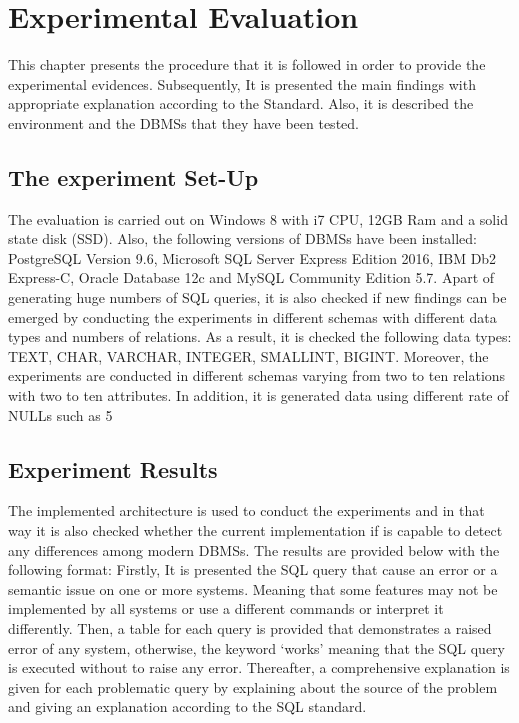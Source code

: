 \chapter{Experimental Evaluation}
This chapter presents the procedure that it is followed in order to provide the experimental evidences. Subsequently, It is presented the main findings with appropriate explanation according to the Standard. Also, it is described  the environment and the DBMSs that they have been tested. 

\section{The experiment Set-Up}
The evaluation is carried out on Windows 8 with i7 CPU, 12GB Ram and a solid state disk (SSD). Also, the  following versions of DBMSs have been installed: PostgreSQL Version 9.6, Microsoft SQL Server Express Edition 2016, IBM Db2 Express-C, Oracle Database 12c and  MySQL Community Edition 5.7. 
Apart of generating huge numbers of SQL queries, it is also checked if new findings can be emerged by conducting the experiments in different schemas with different data types and numbers of relations. As a result, it is checked the following data types:  TEXT, CHAR, VARCHAR, INTEGER, SMALLINT, BIGINT. Moreover, the experiments are conducted in different schemas varying from two to ten relations with two to ten attributes. In addition, it is generated data using different rate of NULLs such as 5%


\section{Experiment Results}
The implemented architecture is used to conduct the experiments and in that way it is also checked whether the current implementation if is capable to detect any differences among modern DBMSs. The results are provided below with the following format: Firstly,  It is presented  the SQL query that cause an error or a semantic issue on one or more systems. Meaning that some features may not be implemented by all systems or use a different commands or interpret it differently.  Then, a table for each query is provided that demonstrates a raised error of any system, otherwise, the keyword ‘works’ meaning that the SQL query is executed without to raise any error. Thereafter, a comprehensive explanation is given for each problematic query by explaining about the source of the problem and giving an explanation according to the SQL standard.   

